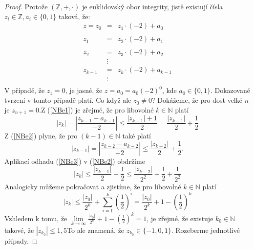 \documentclass[czech,bachelor,dept470,male]{diploma}
\begin{document}
\begin{proof}
	Protože $(\mathbb{Z},+,\cdot)$ je euklidovský obor integrity, jistě existují čísla $z_i\in\mathbb{Z}, a_i\in\{0,1\}$ taková, že:
	\begin{equation}\label{NBe1}
		\begin{array}{rcl}
			z = z_0 & =      & z_1\cdot(-2) + a_0       \\
			        &        &                          \\
			z_1     & =      & z_2\cdot(-2) + a_1       \\
			        &        &                          \\
			z_2     & =      & z_3\cdot(-2) + a_2       \\
			        & \vdots &                          \\
			z_{k-1} & =      & z_{k}\cdot(-2) + a_{k-1} \\
			        & \vdots &                          \\
		\end{array}
	\end{equation}
	V případě, že $z_1=0$, je jasné, že $z = a_0 = a_0(-2)^0$, kde $a_0\in\{0,1\}$. Dokazované tvrzení v tomto případě platí. Co když ale $z_0 \neq 0$?
	Dokážeme, že pro dost velké $n$ je $z_{n+1} = 0$.\newline Z (\ref{NBe1}) je zřejmé, že pro libovolné $k \in \mathbb{N}$ platí
	\begin{equation}\label{NBe2}
		|z_k|=\left|\frac{z_{k-1}-a_{k-1}}{-2}\right|\leq \frac{|z_{k-1}|+1}{2} = \frac{|z_{k-1}|}{2} + \frac{1}{2}
	\end{equation}
	Z (\ref{NBe2}) plyne, že pro $(k-1) \in \mathbb{N}$ také platí
	\begin{equation}\label{NBe3}
		|z_{k-1}|=\left|\frac{z_{k-2}-a_{k-2}}{-2}\right|\leq \frac{|z_{k-2}|}{2} + \frac{1}{2}.
	\end{equation}
	Aplikací odhadu (\ref{NBe3}) v (\ref{NBe2}) obdržíme
	\begin{equation*}\label{NBe4}
		|z_k| \leq \frac{|z_{k-1}|}{2} + \frac{1}{2} \leq \frac{|z_{k-2}|}{2^2} + \frac{1}{2} + \frac{1}{2^2}
	\end{equation*}
	Analogicky můžeme pokračovat a zjistíme, že pro libovolné $k \in \mathbb{N}$ platí
	\begin{equation}\label{NBe5}
		|z_k| \leq \frac{|z_0|}{2^k}+\sum_{i=1}^{k}\left(\frac{1}{2}\right)^i = \frac{|z_0|}{2^k}+1-\left(\frac{1}{2}\right)^k
	\end{equation}
	Vzhledem k tomu, že $\lim\limits_{k\to\infty}\frac{|z_0|}{2^k}+1-\left(\frac{1}{2}\right)^k=1$, je zřejmé, že existuje $k_0 \in \mathbb{N}$ takové, že $|z_{k_0}| \leq 1,5$\newline To ale znamená, že $z_{k_0} \in \{-1, 0, 1\}$. Rozeberme jednotlivé případy.

\end{proof}
\end{document}
